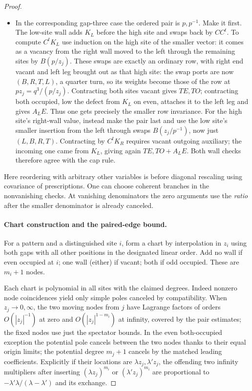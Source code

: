 \begin{proof}
\begin{itemize}
\item In the corresponding gap-three case the ordered pair is \(p,p^{-1}\). Make it first. The low-site wall adds \(K_L\) before the high site and swaps back by \(CC^t\). To compute \(C^t K_L\) use induction on the high site of the smaller vector: it comes as a vacancy from the right wall moved to the left through the remaining sites by \(B(p/z_j)\). These swaps are exactly an ordinary row, with right end vacant and left leg brought out as that high site: the swap ports are now \((B,R,T,L)\), a quarter turn, so its weights become those of the row at \(p z_j=q^3/(p/z_j)\). Contracting both sites vacant gives \(T E,T O\); contracting both occupied, low the defect from \(K_L\) on even, attaches it to the left leg and gives \(A_L E\). Thus one gets precisely the smaller row invariance. For the high site's right-wall value, instead make the pair last and use the low site's smaller insertion from the left through swaps \(B(z_j/p^{-1})\), now just \((L,B,R,T)\). Contracting by \(C^t K_R\) requires vacant outgoing auxiliary; the incoming one came from \(K_L\), giving again \(T E,T O+A_L E\). Both wall checks therefore agree with the cap rule.
\end{itemize}
Here reordering with arbitrary other variables is before diagonal rescaling using covariance of prescriptions. One can choose coherent branches in the nonvanishing checks. At vanishing denominators the zero arguments use the \emph{ratio} after the smaller denominator is already canceled.

\paragraph{Chart construction and the paired-edge bound.}
For a pattern and a distinguished site \(i\), form a chart by interpolation in \(z_i\) using both gaps with all other positions in the designated linear order. Add no wall if even occupied at \(i\); one wall (either) if vacant; both if odd occupied. These are \(m_i+1\) nodes. 

Each chart is polynomial in all sites with the claimed degrees. Indeed nonzero node coincidences yield only simple poles canceled by compatibility. When \(z_j\to0,\infty\), the two moving nodes from \(j\) have Lagrange factors of orders \(O(|z_j|^{-1})\) at zero and \(O(|z_j|^{1-m_i})\) at infinity, covered by the pair estimates; the fixed nodes use just the spectator bounds. In the even both-occupied exception the potential pole cancels between the two nodes thanks to their equal origin limits; the potential degree \(m_j+1\) cancels by the matched leading coefficients. Explicitly if their locations are \(\lambda z_j,\lambda' z_j\), the offending two infinity multipliers after inserting \((\lambda z_j)^{m_i}\) or \((\lambda'z_j)^{m_i}\) are proportional to \(-\lambda'\lambda/(\lambda-\lambda')\) and its exchange.


\end{proof}
